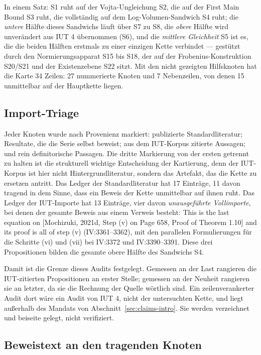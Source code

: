 \documentclass[11pt,a4paper]{article}
\theoremstyle{definition}
\theoremstyle{remark}
\begin{document}
In einem Satz: S1 ruht auf der Vojta-Ungleichung S2, die auf der First Main
Bound S3 ruht, die vollständig auf dem Log-Volumen-Sandwich S4 ruht; die
\emph{untere} Hälfte dieses Sandwichs läuft über S7 zu S8, die \emph{obere}
Hälfte wird unverändert aus IUT 4 übernommen (S6), und die \emph{mittlere
Gleichheit} S5 ist es, die die beiden Hälften erstmals zu einer einzigen
Kette verbindet --- gestützt durch den Normierungsapparat S15 bis S18, der
auf der Frobenius-Konstruktion S20/S21 und der Existenzebene S22 sitzt. Mit
den nicht gezeigten Hilfsknoten hat die Karte 34 Zeilen: 27 nummerierte
Knoten und 7 Nebenzeilen, von denen 15 unmittelbar auf der Hauptkette
liegen.

\subsection{Import-Triage}

Jeder Knoten wurde nach Provenienz markiert: publizierte Standardliteratur;
Resultate, die die Serie selbst beweist; aus dem IUT-Korpus zitierte
Aussagen; und rein definitorische Passagen. Die dritte Markierung von der
ersten getrennt zu halten ist die strukturell wichtige Entscheidung der
Kartierung, denn der IUT-Korpus ist hier nicht Hintergrundliteratur, sondern
das Artefakt, das die Kette zu ersetzen antritt. Das Ledger der
Standardliteratur hat 17 Einträge, 11 davon tragend in dem Sinne, dass ein
Beweis der Kette unmittelbar auf ihnen ruht. Das Ledger der IUT-Importe hat
13 Einträge, vier davon \emph{unausgeführte Vollimporte}, bei denen der
gesamte Beweis aus einem Verweis besteht: \glqq This is the last equation on
[Mochizuki, 2021d, Step (v) on Page 658, Proof of Theorem 1.10] and its
proof is all of step (v)\grqq{} (IV:3361--3362), mit den parallelen
Formulierungen für die Schritte (vi) und (vii) bei IV:3372 und
IV:3390--3391. Diese drei Propositionen bilden die gesamte obere Hälfte des
Sandwichs S4.

Damit ist die Grenze dieses Audits festgelegt. Gemessen an der Last rangieren
die IUT-zitierten Propositionen an erster Stelle; gemessen an der Neuheit
rangieren sie an letzter, da sie die Rechnung der Quelle wörtlich sind. Ein
zeilenverankerter Audit dort wäre ein Audit von IUT 4, nicht der
untersuchten Kette, und liegt außerhalb des Mandats von
Abschnitt~\ref{sec:claims-intro}. Sie werden verzeichnet und beiseite
gelegt, nicht verifiziert.

\subsection{Beweistext an den tragenden Knoten}
\end{document}
